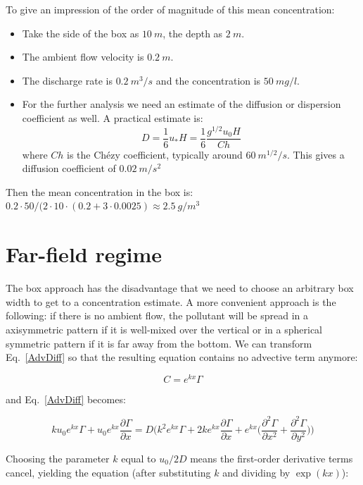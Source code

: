 \documentclass[onecolumn]{article}
\begin{document}
To give an impression of the order of magnitude of this mean concentration:
\begin{itemize}
\item
Take the side of the box as \(10~m\), the depth as \(2~m\).
\item
The ambient flow velocity is \(0.2~m\).
\item
The discharge rate is \(0.2~m^3/s\) and the concentration is \(50~mg/l\).
\item
For the further analysis we need an estimate of the diffusion or dispersion coefficient as well. A practical
estimate is:
\begin{equation}
    D = \frac{1}{6} u_* H = \frac{1}{6} \frac{g^{1/2} u_0 H}{Ch}
\end{equation}
\noindent where \(Ch\) is the Ch\'ezy coefficient, typically around \(60~m^{1/2}/s\). This gives a
diffusion coefficient of \(0.02~m/s^2\)
\end{itemize}

Then the mean concentration in the box is: \(0.2 \cdot 50 / (2 \cdot 10 \cdot (0.2 + 3 \cdot 0.0025) \approx 2.5~g/m^3\)

\section*{Far-field regime}
The box approach has the disadvantage that we need to choose an arbitrary box width to get to a
concentration estimate. A more convenient approach is the following: if there is no ambient flow, the
pollutant will be spread in a axisymmetric pattern if it is well-mixed over the vertical or in a spherical
symmetric pattern if it is far away from the bottom. We can transform Eq.\ \ref{AdvDiff} so that the
resulting equation contains no advective term anymore:

\begin{equation}
C = e^{kx} \Gamma
\end{equation}

\noindent and Eq.\ \ref{AdvDiff} becomes:

\begin{equation}
k u_0 e^{kx} \Gamma + u_0 e^{kx} \frac{\partial \Gamma}{\partial x} = D \bigl ( k^2 e^{kx} \Gamma + 2 k e^{kx} \frac{\partial \Gamma}{\partial x} + e^{kx} \bigl ( \frac{\partial^2 \Gamma}{\partial x^2} + \frac{\partial^2 \Gamma}{\partial y^2} \bigr ) \bigr )
\end{equation}

Choosing the parameter \(k\) equal to \(u_0/2D\) means the first-order derivative terms cancel, yielding the
equation (after substituting \(k\) and dividing by \(\exp(kx)\)):
\end{document}
